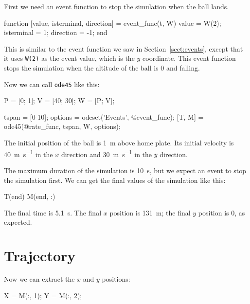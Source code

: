 \documentclass[
]{book}
\numberwithin{Answer}{chapter}
\numberwithin{Exercise}{chapter}
\begin{document}

First we need an event function to stop the simulation when the ball lands.

\begin{code}
function [value, isterminal, direction] = event_func(t, W)
    value = W(2);
    isterminal = 1;
    direction = -1;
end
\end{code}


This is similar to the event function we saw in Section~\ref{sect:events}, except that it uses {\tt W(2)} as the event value, which is the $y$ coordinate.  This event function stops the simulation when the altitude of the ball is 0 and falling.

Now we can call {\tt ode45} like this:

\begin{code}
    P = [0; 1];       %
    V = [40; 30];     %
    W = [P; V];       %
    
    tspan = [0 10];
    options = odeset('Events', @event_func);
    [T, M] = ode45(@rate_func, tspan, W, options);
\end{code}

The initial position of the ball is \SI{1}{\meter} above home plate.  Its initial velocity is \SI{40}{\meter\per\second} in the $x$ direction and \SI{30}{\meter\per\second} in the $y$ direction.


The maximum duration of the simulation is \SI{10}{\second}, but we expect an event to stop the simulation first.  We can get the final values of the simulation like this:
    
\begin{code}
    T(end)
    M(end, :)
\end{code}

The final time is \SI{5.1}{\second}.  The final $x$ position is \SI{131}{\meter}; the final $y$ position is 0, as expected.


\section{Trajectory}

Now we can extract the $x$ and $y$ positions:

\begin{code}
    X = M(:, 1);
    Y = M(:, 2);
\end{code}
\end{document}
